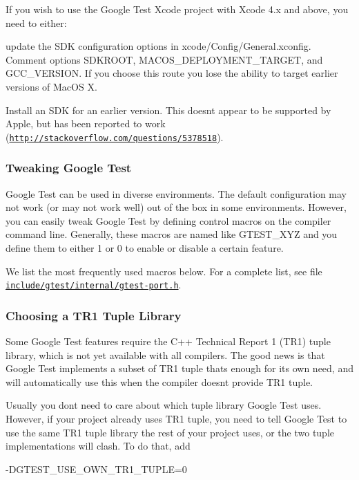 If you wish to use the Google Test Xcode project with Xcode 4.\+x and above, you need to either\+:


\begin{DoxyItemize}
\item update the S\+DK configuration options in xcode/\+Config/\+General.\+xconfig. Comment options {\ttfamily S\+D\+K\+R\+O\+OT}, {\ttfamily M\+A\+C\+O\+S\+\_\+\+D\+E\+P\+L\+O\+Y\+M\+E\+N\+T\+\_\+\+T\+A\+R\+G\+ET}, and {\ttfamily G\+C\+C\+\_\+\+V\+E\+R\+S\+I\+ON}. If you choose this route you lose the ability to target earlier versions of Mac\+OS X.
\item Install an S\+DK for an earlier version. This doesn\textquotesingle{}t appear to be supported by Apple, but has been reported to work (\href{http://stackoverflow.com/questions/5378518}{\tt http\+://stackoverflow.\+com/questions/5378518}).
\end{DoxyItemize}

\subsubsection*{Tweaking Google Test}

Google Test can be used in diverse environments. The default configuration may not work (or may not work well) out of the box in some environments. However, you can easily tweak Google Test by defining control macros on the compiler command line. Generally, these macros are named like {\ttfamily G\+T\+E\+S\+T\+\_\+\+X\+YZ} and you define them to either 1 or 0 to enable or disable a certain feature.

We list the most frequently used macros below. For a complete list, see file \href{https://github.com/google/googletest/blob/master/include/gtest/internal/gtest-port.h}{\tt include/gtest/internal/gtest-\/port.\+h}.

\subsubsection*{Choosing a T\+R1 Tuple Library}

Some Google Test features require the C++ Technical Report 1 (T\+R1) tuple library, which is not yet available with all compilers. The good news is that Google Test implements a subset of T\+R1 tuple that\textquotesingle{}s enough for its own need, and will automatically use this when the compiler doesn\textquotesingle{}t provide T\+R1 tuple.

Usually you don\textquotesingle{}t need to care about which tuple library Google Test uses. However, if your project already uses T\+R1 tuple, you need to tell Google Test to use the same T\+R1 tuple library the rest of your project uses, or the two tuple implementations will clash. To do that, add \begin{DoxyVerb}-DGTEST_USE_OWN_TR1_TUPLE=0
\end{DoxyVerb}


